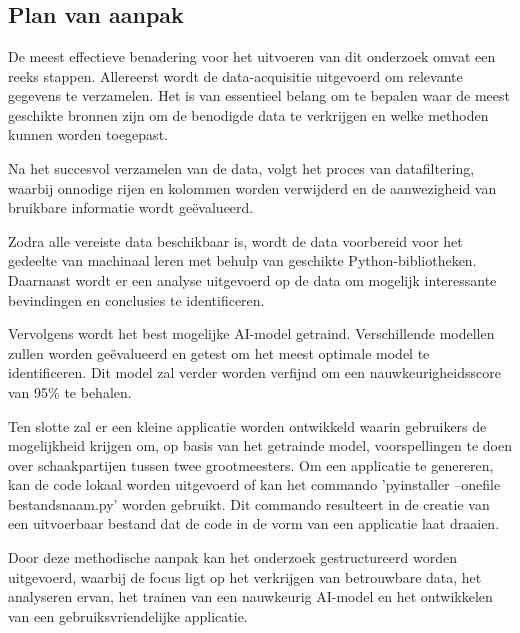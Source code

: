 
\chapter{}
\label{ch:methodologie}

\section{Plan van aanpak}

De meest effectieve benadering voor het uitvoeren van dit onderzoek omvat een reeks stappen. Allereerst wordt de data-acquisitie uitgevoerd om relevante gegevens te verzamelen. Het is van essentieel belang om te bepalen waar de meest geschikte bronnen zijn om de benodigde data te verkrijgen en welke methoden kunnen worden toegepast.

Na het succesvol verzamelen van de data, volgt het proces van datafiltering, waarbij onnodige rijen en kolommen worden verwijderd en de aanwezigheid van bruikbare informatie wordt geëvalueerd.

Zodra alle vereiste data beschikbaar is, wordt de data voorbereid voor het gedeelte van machinaal leren met behulp van geschikte Python-bibliotheken. Daarnaast wordt er een analyse uitgevoerd op de data om mogelijk interessante bevindingen en conclusies te identificeren.

Vervolgens wordt het best mogelijke AI-model getraind. Verschillende modellen zullen worden geëvalueerd en getest om het meest optimale model te identificeren. Dit model zal verder worden verfijnd om een nauwkeurigheidsscore van 95\% te behalen.

Ten slotte zal er een kleine applicatie worden ontwikkeld waarin gebruikers de mogelijkheid krijgen om, op basis van het getrainde model, voorspellingen te doen over schaakpartijen tussen twee grootmeesters. Om een applicatie te genereren, kan de code lokaal worden uitgevoerd of kan het commando 'pyinstaller --onefile bestandsnaam.py' worden gebruikt. Dit commando resulteert in de creatie van een uitvoerbaar bestand dat de code in de vorm van een applicatie laat draaien.

Door deze methodische aanpak kan het onderzoek gestructureerd worden uitgevoerd, waarbij de focus ligt op het verkrijgen van betrouwbare data, het analyseren ervan, het trainen van een nauwkeurig AI-model en het ontwikkelen van een gebruiksvriendelijke applicatie. 

